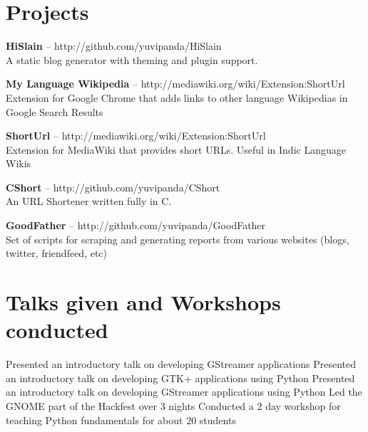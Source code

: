 \documentclass[11pt,a4paper]{moderncv}
\begin{document}

\pagebreak
\section{Projects}

\cvlistitem
{\textbf{HiSlain} -- {\small http://github.com/yuvipanda/HiSlain}
  \\A static blog generator with theming and plugin support.\\
}

\cvlistitem
{\textbf{My Language Wikipedia} -- {\small http://mediawiki.org/wiki/Extension:ShortUrl}
  \\Extension for Google Chrome that adds links to other language Wikipedias in Google Search Results\\
}

\cvlistitem
{\textbf{ShortUrl} -- {\small http://mediawiki.org/wiki/Extension:ShortUrl}
  \\Extension for MediaWiki that provides short URLs. Useful in Indic Language Wikis\\
}

\cvlistitem
{\textbf{CShort} -- {\small http://github.com/yuvipanda/CShort}
  \\An URL Shortener written fully in C.\\
}

\cvlistitem
{\textbf{GoodFather} -- {\small http://github.com/yuvipanda/GoodFather}
  \\Set of scripts for scraping and generating reports from various websites (blogs, twitter, friendfeed, etc)\\
}



\section{Talks given and Workshops conducted}

{Presented an introductory talk on developing GStreamer applications}
{Presented an introductory talk on developing GTK+ applications using Python}
{Presented an introductory talk on developing GStreamer applications using Python}
{Led the GNOME part of the Hackfest over 3 nights}
{Conducted a 2 day workshop for teaching Python fundamentals for about 20 students} 
\end{document}
